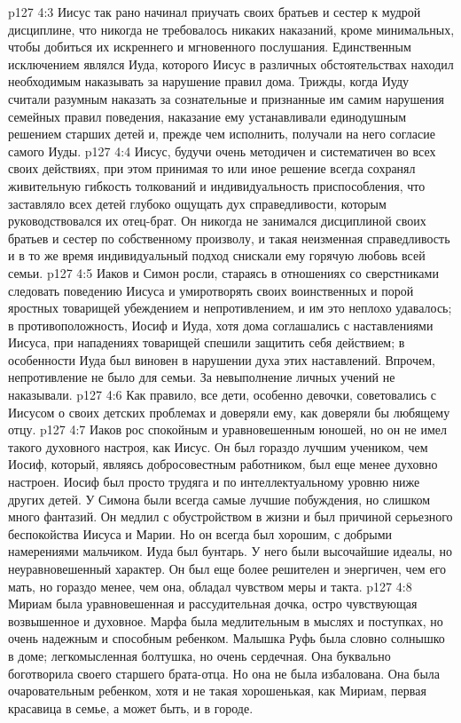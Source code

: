 \vs p127 4:3 Иисус так рано начинал приучать своих братьев и сестер к мудрой дисциплине, что никогда не требовалось никаких наказаний, кроме минимальных, чтобы добиться их искреннего и мгновенного послушания. Единственным исключением являлся Иуда, которого Иисус в различных обстоятельствах находил необходимым наказывать за нарушение правил дома. Трижды, когда Иуду считали разумным наказать за сознательные и признанные им самим нарушения семейных правил поведения, наказание ему устанавливали единодушным решением старших детей и, прежде чем исполнить, получали на него согласие самого Иуды.
\vs p127 4:4 Иисус, будучи очень методичен и систематичен во всех своих действиях, при этом принимая то или иное решение всегда сохранял живительную гибкость толкований и индивидуальность приспособления, что заставляло всех детей глубоко ощущать дух справедливости, которым руководствовался их отец\hyp{}брат. Он никогда не занимался дисциплиной своих братьев и сестер по собственному произволу, и такая неизменная справедливость и в то же время индивидуальный подход снискали ему горячую любовь всей семьи.
\vs p127 4:5 Иаков и Симон росли, стараясь в отношениях со сверстниками следовать поведению Иисуса и умиротворять своих воинственных и порой яростных товарищей убеждением и непротивлением, и им это неплохо удавалось; в противоположность, Иосиф и Иуда, хотя дома соглашались с наставлениями Иисуса, при нападениях товарищей спешили защитить себя действием; в особенности Иуда был виновен в нарушении духа этих наставлений. Впрочем, непротивление не было  для семьи. За невыполнение личных учений не наказывали.
\vs p127 4:6 Как правило, все дети, особенно девочки, советовались с Иисусом о своих детских проблемах и доверяли ему, как доверяли бы любящему отцу.
\vs p127 4:7 Иаков рос спокойным и уравновешенным юношей, но он не имел такого духовного настроя, как Иисус. Он был гораздо лучшим учеником, чем Иосиф, который, являясь добросовестным работником, был еще менее духовно настроен. Иосиф был просто трудяга и по интеллектуальному уровню ниже других детей. У Симона были всегда самые лучшие побуждения, но слишком много фантазий. Он медлил с обустройством в жизни и был причиной серьезного беспокойства Иисуса и Марии. Но он всегда был хорошим, с добрыми намерениями мальчиком. Иуда был бунтарь. У него были высочайшие идеалы, но неуравновешенный характер. Он был еще более решителен и энергичен, чем его мать, но гораздо менее, чем она, обладал чувством меры и такта.
\vs p127 4:8 Мириам была уравновешенная и рассудительная дочка, остро чувствующая возвышенное и духовное. Марфа была медлительным в мыслях и поступках, но очень надежным и способным ребенком. Малышка Руфь была словно солнышко в доме; легкомысленная болтушка, но очень сердечная. Она буквально боготворила своего старшего брата\hyp{}отца. Но она не была избалована. Она была очаровательным ребенком, хотя и не такая хорошенькая, как Мириам, первая красавица в семье, а может быть, и в городе.
